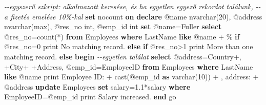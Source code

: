\documentclass[
  magyar,
]{article}
\newenvironment{Shaded}{}{}
\newcommand{\CommentTok}[1]{\textcolor[rgb]{0.38,0.63,0.69}{\textit{#1}}}
\newcommand{\ControlFlowTok}[1]{\textcolor[rgb]{0.00,0.44,0.13}{\textbf{#1}}}
\newcommand{\DataTypeTok}[1]{\textcolor[rgb]{0.56,0.13,0.00}{#1}}
\newcommand{\DecValTok}[1]{\textcolor[rgb]{0.25,0.63,0.44}{#1}}
\newcommand{\FloatTok}[1]{\textcolor[rgb]{0.25,0.63,0.44}{#1}}
\newcommand{\FunctionTok}[1]{\textcolor[rgb]{0.02,0.16,0.49}{#1}}
\newcommand{\KeywordTok}[1]{\textcolor[rgb]{0.00,0.44,0.13}{\textbf{#1}}}
\newcommand{\NormalTok}[1]{#1}
\newcommand{\OperatorTok}[1]{\textcolor[rgb]{0.40,0.40,0.40}{#1}}
\newcommand{\StringTok}[1]{\textcolor[rgb]{0.25,0.44,0.63}{#1}}
\begin{document}
\begin{Shaded}
\begin{Highlighting}[]
\CommentTok{{-}{-}egyszerű szkript: alkalmazott keresése, és ha egyetlen egyező rekordot találunk,}
\CommentTok{{-}{-}a fizetés emelése 10\%{-}kal}
\KeywordTok{set}\NormalTok{ nocount }\KeywordTok{on}
\KeywordTok{declare}\NormalTok{ @name }\DataTypeTok{nvarchar}\NormalTok{(}\DecValTok{20}\NormalTok{), @address }\DataTypeTok{nvarchar}\NormalTok{(}\FunctionTok{max}\NormalTok{), @res\_no }\DataTypeTok{int}\NormalTok{, @emp\_id }\DataTypeTok{int}
\KeywordTok{set}\NormalTok{ @name}\OperatorTok{=}\StringTok{\textquotesingle{}Fuller\textquotesingle{}}
\KeywordTok{select}\NormalTok{ @res\_no}\OperatorTok{=}\FunctionTok{count}\NormalTok{(}\OperatorTok{*}\NormalTok{) }\KeywordTok{from}\NormalTok{ Employees }\KeywordTok{where}\NormalTok{ LastName }\KeywordTok{like}\NormalTok{ @name }\OperatorTok{+} \StringTok{\textquotesingle{}\%\textquotesingle{}}
\ControlFlowTok{if}\NormalTok{ @res\_no}\OperatorTok{=}\DecValTok{0}\NormalTok{ print }\StringTok{\textquotesingle{}No matching record.\textquotesingle{}}
\ControlFlowTok{else} \ControlFlowTok{if}\NormalTok{ @res\_no}\OperatorTok{\textgreater{}}\DecValTok{1}\NormalTok{ print }\StringTok{\textquotesingle{}More than one matching record.\textquotesingle{}}
\ControlFlowTok{else} \ControlFlowTok{begin} \CommentTok{{-}{-}egyetlen találat}
    \KeywordTok{select}\NormalTok{ @address}\OperatorTok{=}\NormalTok{Country}\OperatorTok{+}\StringTok{\textquotesingle{}, \textquotesingle{}}\OperatorTok{+}\NormalTok{City}\OperatorTok{+}\StringTok{\textquotesingle{} \textquotesingle{}}\OperatorTok{+}\NormalTok{Address, @emp\_id}\OperatorTok{=}\NormalTok{EmployeeID}
        \KeywordTok{from}\NormalTok{ Employees }\KeywordTok{where}\NormalTok{ LastName }\KeywordTok{like}\NormalTok{ @name}
\NormalTok{    print }\StringTok{\textquotesingle{}Employee ID: \textquotesingle{}} \OperatorTok{+} \FunctionTok{cast}\NormalTok{(@emp\_id }\KeywordTok{as} \DataTypeTok{varchar}\NormalTok{(}\DecValTok{10}\NormalTok{)) }\OperatorTok{+} \StringTok{\textquotesingle{}, address: \textquotesingle{}} \OperatorTok{+}\NormalTok{ @address}
    \KeywordTok{update}\NormalTok{ Employees }\KeywordTok{set}\NormalTok{ salary}\OperatorTok{=}\FloatTok{1.1}\OperatorTok{*}\NormalTok{salary }\KeywordTok{where}\NormalTok{ EmployeeID}\OperatorTok{=}\NormalTok{@emp\_id}
\NormalTok{    print }\StringTok{\textquotesingle{}Salary increased.\textquotesingle{}}
\ControlFlowTok{end}
\NormalTok{go}


\end{Highlighting}
\end{Shaded}
\end{document}
